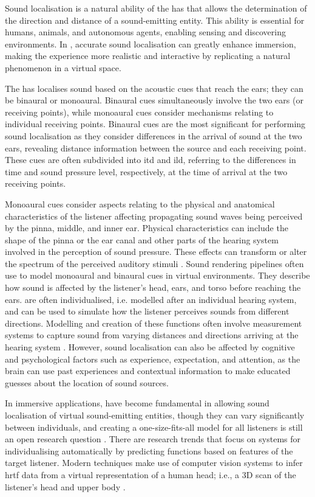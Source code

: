 Sound localisation is a natural ability of the \acrshort{has} that allows the determination of the direction and distance of a sound-emitting entity. This ability is essential for humans, animals, and autonomous agents, enabling sensing and discovering environments. In , accurate sound localisation can greatly enhance immersion, making the experience more realistic and interactive by replicating a natural phenomenon in a virtual space.\par
The \acrshort{has} localises sound based on the acoustic cues that reach the ears; they can be binaural or monoaural. Binaural cues simultaneously involve the two ears (or receiving points), while monoaural cues consider mechanisms relating to individual receiving points. Binaural cues are the most significant for performing sound localisation as they consider differences in the arrival of sound at the two ears, revealing distance information between the source and each receiving point. These cues are often subdivided into \acrfull{itd} and \acrfull{ild}, referring to the differences in time and sound pressure level, respectively, at the time of arrival at the two receiving points.\par
Monoaural cues consider aspects relating to the physical and anatomical characteristics of the listener affecting propagating sound waves being perceived by the pinna, middle, and inner ear. Physical characteristics can include the shape of the pinna or the ear canal and other parts of the hearing system involved in the perception of sound pressure. These effects can transform or alter the spectrum of the perceived auditory stimuli \citep{blauert1997spatial, howard2013acoustics}.
Sound rendering pipelines often use  to model monoaural and binaural cues in virtual environments. They describe how sound is affected by the listener's head, ears, and torso before reaching the ears.  are often individualised, i.e. modelled after an individual hearing system, and can be used to simulate how the listener perceives sounds from different directions. Modelling and creation of these functions often involve measurement systems to capture sound from varying distances and directions arriving at the hearing system \citep{zotkin2003hrtf}. However, sound localisation can also be affected by cognitive and psychological factors such as experience, expectation, and attention, as the brain can use past experiences and contextual information to make educated guesses about the location of sound sources.\par
In immersive applications,  have become fundamental in allowing sound localisation of virtual sound-emitting entities, though they can vary significantly between individuals, and creating a one-size-fits-all model for all listeners is still an open research question \citep{plugnplayAuralisations}.
There are research trends that focus on systems for individualising  automatically by predicting functions based on features of the target listener. Modern techniques make use of computer vision systems to infer \acrshort{hrtf} data from a virtual representation of a human head; i.e., a 3D scan of the listener's head and upper body \citep{zotkin2003hrtf}.

